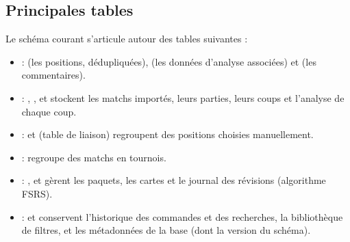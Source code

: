 \documentclass[letterpaper,10pt,french]{sphinxmanual}
\begin{document}
\subsection{Principales tables}
\label{\detokenize{annexe_db_scheme:principales-tables}}
\sphinxAtStartPar
Le schéma courant s’articule autour des tables suivantes :
\begin{itemize}
\item {} 
\sphinxAtStartPar
{} :  (les positions, dédupliquées),
 (les données d’analyse associées) et  (les
commentaires).

\item {} 
\sphinxAtStartPar
{} : , ,  et  stockent les
matchs importés, leurs parties, leurs coups et l’analyse de chaque coup.

\item {} 
\sphinxAtStartPar
{} :  et  (table de liaison)
regroupent des positions choisies manuellement.

\item {} 
\sphinxAtStartPar
{} :  regroupe des matchs en tournois.

\item {} 
\sphinxAtStartPar
{} : ,  et
 gèrent les paquets, les cartes et le journal des
révisions (algorithme FSRS).

\item {} 
\sphinxAtStartPar
{} :  et 
conservent l’historique des commandes et des recherches, 
la bibliothèque de filtres, et  les métadonnées de la base
(dont la version du schéma).

\end{itemize}
\end{document}
